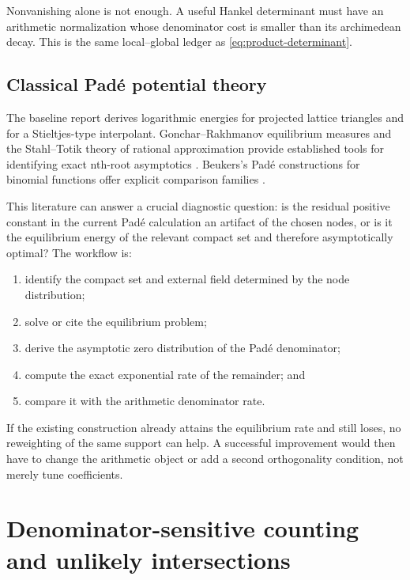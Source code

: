 \documentclass[10pt,letterpaper]{article}
\begin{document}
Nonvanishing alone is not enough.  A useful Hankel determinant must have an arithmetic
normalization whose denominator cost is smaller than its archimedean decay.  This is the same
local--global ledger as \cref{eq:product-determinant}.

\subsection{Classical Pad\'e potential theory}

The baseline report derives logarithmic energies for projected lattice triangles and for a
Stieltjes-type interpolant.  Gonchar--Rakhmanov equilibrium measures and the Stahl--Totik
theory of rational approximation provide established tools for identifying exact nth-root
asymptotics \cite{GoncharRakhmanov,StahlTotik}.  Beukers's Pad\'e constructions for binomial
functions offer explicit comparison families \cite{BeukersPade}.

This literature can answer a crucial diagnostic question: is the residual positive constant
in the current Pad\'e calculation an artifact of the chosen nodes, or is it the equilibrium
energy of the relevant compact set and therefore asymptotically optimal?  The workflow is:

\begin{enumerate}
\item identify the compact set and external field determined by the node distribution;
\item solve or cite the equilibrium problem;
\item derive the asymptotic zero distribution of the Pad\'e denominator;
\item compute the exact exponential rate of the remainder; and
\item compare it with the arithmetic denominator rate.
\end{enumerate}

If the existing construction already attains the equilibrium rate and still loses, no
reweighting of the same support can help.  A successful improvement would then have to
change the arithmetic object or add a second orthogonality condition, not merely tune
coefficients.

\clearpage
\section{Denominator-sensitive counting and unlikely intersections}
\label{sec:counting}
\end{document}
